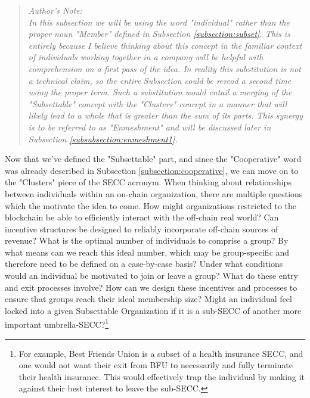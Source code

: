 \documentclass{article}[10pt]
\begin{document}
\begin{quote}
    \textit{Author's Note:}\\
    \textit{In this subsection we will be using the word "individual" rather than the proper noun "Member" defined in Subsection \ref{subsection:subset}.
    This is entirely because I believe thinking about this concept in the familiar context of individuals working together in a company will be helpful with comprehension on a first pass of the idea.
    In reality this substitution is not a technical claim, so the entire Subsection could be reread a second time using the proper term.
    Such a substitution would entail a merging of the "Subsettable" concept with the "Clusters" concept in a manner that will likely lead to a whole that is greater than the sum of its parts.
    This synergy is to be referred to as "Enmeshment" and will be discussed later in Subsection \ref{subsubsection:enmeshment1}.}\par
\end{quote}


Now that we've defined the "Subsettable" part, and since the "Cooperative" word was already described in Subsection \ref{subsection:cooperative}, we can move on to the "Clusters" piece of the SECC acronym. 
When thinking about relationships between individuals within an on-chain organization, there are multiple questions which the motivate the idea to come.
How might organizations restricted to the blockchain be able to efficiently interact with the off-chain real world?
Can incentive structures be designed to reliably incorporate off-chain sources of revenue?
What is the optimal number of individuals to comprise a group?
By what means can we reach this ideal number, which may be group-specific and therefore need to be defined on a case-by-case basis?
Under what conditions would an individual be motivated to join or leave a group?
What do these entry and exit processes involve?
How can we design these incentives and processes to ensure that groups reach their ideal membership size?
Might an individual feel locked into a given Subsettable Organization if it is a sub-SECC of another more important umbrella-SECC?\footnote{
    For example, Best Friends Union is a subset of a health insurance SECC, and one would not want their exit from BFU to necessarily and fully terminate their health insurance. 
    This would effectively trap the individual by making it against their best interest to leave the sub-SECC.} \par 
\end{document}
